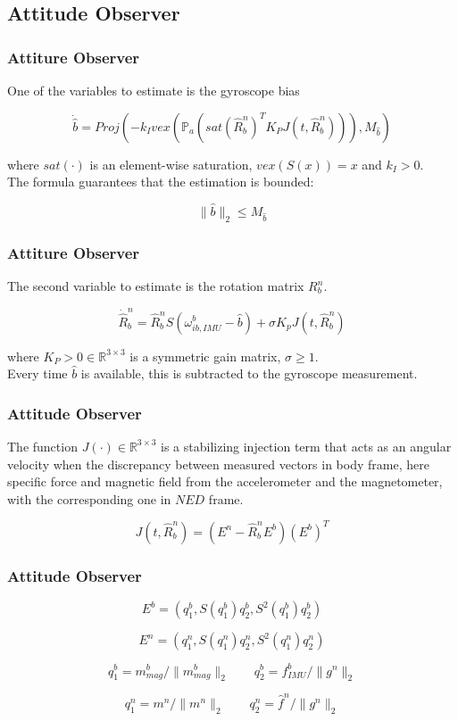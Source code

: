 \documentclass{beamer}
\begin{document}
\subsection{Attitude Observer}

	\begin{frame}
		\frametitle{Attiture Observer}
		One of the variables to estimate is the gyroscope bias
		
		\[ \dot{\hat{b}} = Proj(-k_I vex(\mathds{P}_a (sat(\hat{R}^n_b)^T K_P J(t, \hat{R}^n_b))),M_{\hat{b}} )\]
		
		where $sat(\cdot)$ is an element-wise saturation, $vex(S(x)) = x$ and $k_I > 0$.\\
		\vspace{0.3cm}
		The formula guarantees that the estimation is bounded: 
		
		\[\|\hat{b} \|_2 \leqslant M_{\hat{b}} \]	
	\end{frame}



	\begin{frame}
		\frametitle{Attiture Observer}
		The second variable to estimate is the rotation matrix $R^n_b$.
		
		\[ \dot{\hat{R}}^n_b  =  \hat{R}^n_b S(\omega^b_{ib,IMU} - \hat{b}) + \sigma K_pJ(t, \hat{R}^n_b)       \]
		
		\vspace{0.3cm}
		where $K_P > 0 \in \mathds{R}^{3\times 3}$ is a symmetric gain matrix, $\sigma \geq 1$.\\ 
		\vspace{0.3cm}
		Every time $\hat{b}$ is available, this is subtracted to the gyroscope measurement.\\
	\end{frame}


	\begin{frame}
 		\frametitle{Attitude Observer}
 		The function $J(\cdot) \in  \mathds{R}^{3\times 3}$ is a stabilizing injection term that acts as an angular velocity when the discrepancy between measured vectors in body frame, here specific force and magnetic field from the accelerometer and the magnetometer, with the corresponding one in $NED$ frame.
 		
 		\[ J(t, \hat{R}^n_b)  = (E^n - \hat{R}^n_b E^b)(E^b)^T   \]

 		

	\end{frame}

	\begin{frame}
		\frametitle{Attitude Observer}
		
		\[ E^b = (q_1^b, S(q^b_1)q_2^b, S^2(q_1^b)q_2^b)    \]
		
		\[ E^n = (q_1^n, S(q^n_1)q_2^n, S^2(q_1^n)q_2^n)    \]
		
		
		\[ q_1^b = m^b_{mag}/\|m^b_{mag}\|_2 \qquad q_2^b = f^b_{IMU}/\|g^n\|_2    \]
		
		\[ q_1^n = m^n/\|m^n\|_2 \qquad q_2^n = \hat{f}^n/\|g^n\|_2    \]
		
	\end{frame}
\end{document}
